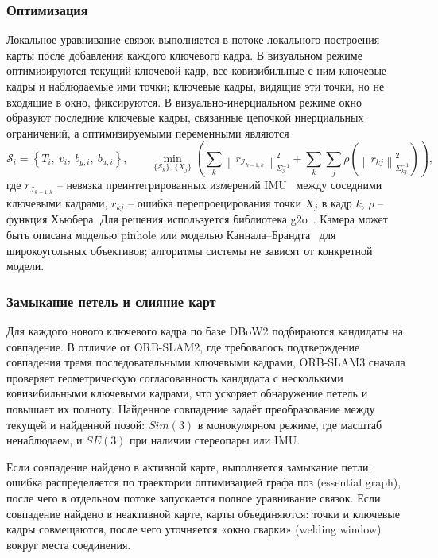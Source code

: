     \subsubsection{Оптимизация}
    Локальное уравнивание связок выполняется в потоке локального построения карты после добавления каждого ключевого кадра.
    В визуальном режиме оптимизируются текущий ключевой кадр, все ковизибильные с ним ключевые кадры и наблюдаемые ими точки; ключевые кадры, видящие эти точки, но не входящие в окно, фиксируются.
    В визуально-инерциальном режиме окно образуют последние ключевые кадры, связанные цепочкой инерциальных ограничений, а оптимизируемыми переменными являются
    \begin{equation}\label{eq:orb_vi_state}
        \mathcal{S}_i = \left\{ T_i,\ v_i,\ b_{g,i},\ b_{a,i} \right\}, \qquad
        \min_{\{\mathcal{S}_k\},\, \{X_j\}} \left( \sum_{k} \left\| r_{\mathcal{I}_{k-1,k}} \right\|^2_{\Sigma_{\mathcal{I}}^{-1}} + \sum_{k}\sum_{j} \rho\left( \left\| r_{kj} \right\|^2_{\Sigma_{kj}^{-1}} \right) \right),
    \end{equation}
    где $r_{\mathcal{I}_{k-1,k}}$ -- невязка преинтегрированных измерений IMU~\cite{preintegration} между соседними ключевыми кадрами, $r_{kj}$ -- ошибка перепроецирования точки $X_j$ в кадр $k$, $\rho$ -- функция Хьюбера.
    Для решения используется библиотека g2o~\cite{g2o}.
    Камера может быть описана моделью pinhole или моделью Каннала--Брандта~\cite{kannala_brandt} для широкоугольных объективов; алгоритмы системы не зависят от конкретной модели.

    \subsubsection{Замыкание петель и слияние карт}
    Для каждого нового ключевого кадра по базе DBoW2 подбираются кандидаты на совпадение.
    В отличие от ORB-SLAM2, где требовалось подтверждение совпадения тремя последовательными ключевыми кадрами, ORB-SLAM3 сначала проверяет геометрическую согласованность кандидата с несколькими ковизибильными ключевыми кадрами, что ускоряет обнаружение петель и повышает их полноту.
    Найденное совпадение задаёт преобразование между текущей и найденной позой: $Sim(3)$ в монокулярном режиме, где масштаб ненаблюдаем, и $SE(3)$ при наличии стереопары или IMU.

    Если совпадение найдено в активной карте, выполняется замыкание петли: ошибка распределяется по траектории оптимизацией графа поз (essential graph), после чего в отдельном потоке запускается полное уравнивание связок.
    Если совпадение найдено в неактивной карте, карты объединяются: точки и ключевые кадры совмещаются, после чего уточняется «окно сварки» (welding window) вокруг места соединения.

